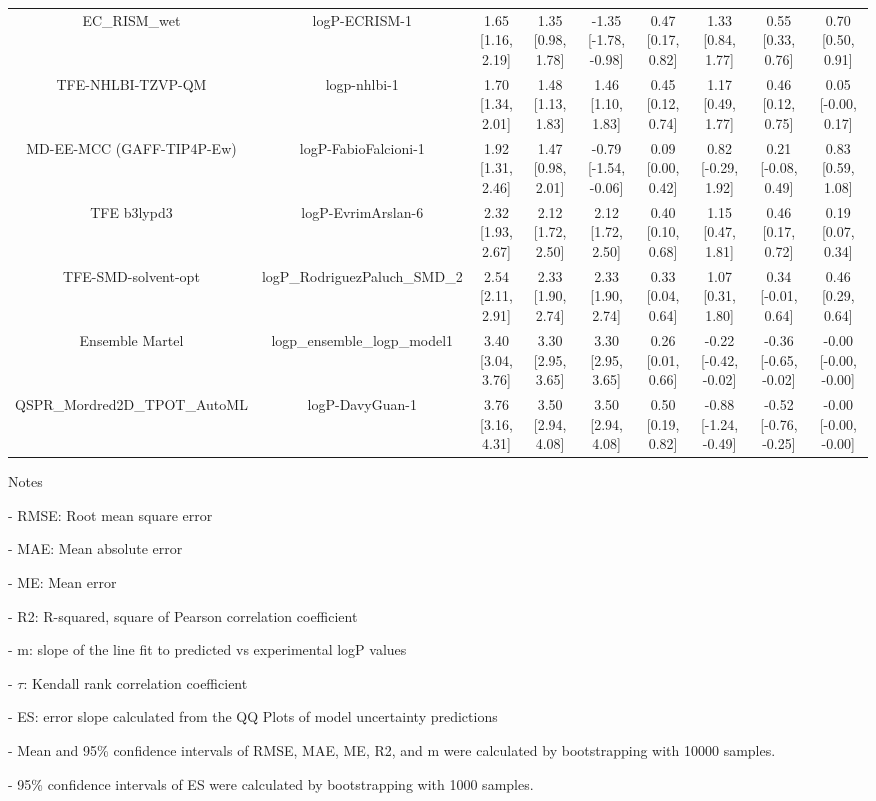 \documentclass{article}
\begin{document}
\begin{center}
\begin{longtable}{|ccccccccc|}
               EC_RISM_wet &                              logP-ECRISM-1 & 1.65 [1.16, 2.19] & 1.35 [0.98, 1.78] & -1.35 [-1.78, -0.98] & 0.47 [0.17, 0.82] &    1.33 [0.84, 1.77] &    0.55 [0.33, 0.76] &    0.70 [0.50, 0.91] \\
         TFE-NHLBI-TZVP-QM &                               logp-nhlbi-1 & 1.70 [1.34, 2.01] & 1.48 [1.13, 1.83] &    1.46 [1.10, 1.83] & 0.45 [0.12, 0.74] &    1.17 [0.49, 1.77] &    0.46 [0.12, 0.75] &   0.05 [-0.00, 0.17] \\
 MD-EE-MCC (GAFF-TIP4P-Ew) &                       logP-FabioFalcioni-1 & 1.92 [1.31, 2.46] & 1.47 [0.98, 2.01] & -0.79 [-1.54, -0.06] & 0.09 [0.00, 0.42] &   0.82 [-0.29, 1.92] &   0.21 [-0.08, 0.49] &    0.83 [0.59, 1.08] \\
               TFE b3lypd3 &                         logP-EvrimArslan-6 & 2.32 [1.93, 2.67] & 2.12 [1.72, 2.50] &    2.12 [1.72, 2.50] & 0.40 [0.10, 0.68] &    1.15 [0.47, 1.81] &    0.46 [0.17, 0.72] &    0.19 [0.07, 0.34] \\
       TFE-SMD-solvent-opt &              logP\_RodriguezPaluch\_SMD\_2 & 2.54 [2.11, 2.91] & 2.33 [1.90, 2.74] &    2.33 [1.90, 2.74] & 0.33 [0.04, 0.64] &    1.07 [0.31, 1.80] &   0.34 [-0.01, 0.64] &    0.46 [0.29, 0.64] \\
           Ensemble Martel &               logp\_ensemble\_logp\_model1 & 3.40 [3.04, 3.76] & 3.30 [2.95, 3.65] &    3.30 [2.95, 3.65] & 0.26 [0.01, 0.66] & -0.22 [-0.42, -0.02] & -0.36 [-0.65, -0.02] & -0.00 [-0.00, -0.00] \\
QSPR_Mordred2D_TPOT_AutoML &                            logP-DavyGuan-1 & 3.76 [3.16, 4.31] & 3.50 [2.94, 4.08] &    3.50 [2.94, 4.08] & 0.50 [0.19, 0.82] & -0.88 [-1.24, -0.49] & -0.52 [-0.76, -0.25] & -0.00 [-0.00, -0.00] \\
\end{longtable}
\end{center}

Notes

- RMSE: Root mean square error

- MAE: Mean absolute error

- ME: Mean error

- R2: R-squared, square of Pearson correlation coefficient

- m: slope of the line fit to predicted vs experimental logP values

- $\tau$:  Kendall rank correlation coefficient

- ES: error slope calculated from the QQ Plots of model uncertainty predictions

- Mean and 95\% confidence intervals of RMSE, MAE, ME, R2, and m were calculated by bootstrapping with 10000 samples.

- 95\% confidence intervals of ES were calculated by bootstrapping with 1000 samples.\end{document}
\end{document}
